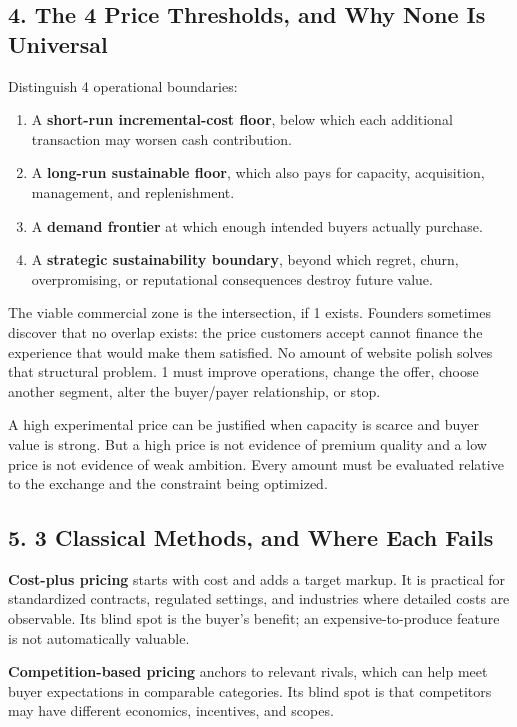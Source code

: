 \subsection*{4. The 4 Price Thresholds, and Why None Is Universal}

Distinguish 4 operational boundaries:
\begin{enumerate}
  \item A \textbf{short-run incremental-cost floor}, below which each additional transaction may worsen cash contribution.
  \item A \textbf{long-run sustainable floor}, which also pays for capacity, acquisition, management, and replenishment.
  \item A \textbf{demand frontier} at which enough intended buyers actually purchase.
  \item A \textbf{strategic sustainability boundary}, beyond which regret, churn, overpromising, or reputational consequences destroy future value.
\end{enumerate}

The viable commercial zone is the intersection, if 1 exists. Founders sometimes discover that no overlap exists: the price customers accept cannot finance the experience that would make them satisfied. No amount of website polish solves that structural problem. 1 must improve operations, change the offer, choose another segment, alter the buyer/payer relationship, or stop.

A high experimental price can be justified when capacity is scarce and buyer value is strong. But a high price is not evidence of premium quality and a low price is not evidence of weak ambition. Every amount must be evaluated relative to the exchange and the constraint being optimized.

\subsection*{5. 3 Classical Methods, and Where Each Fails}

\textbf{Cost-plus pricing} starts with cost and adds a target markup. It is practical for standardized contracts, regulated settings, and industries where detailed costs are observable. Its blind spot is the buyer's benefit; an expensive-to-produce feature is not automatically valuable.

\textbf{Competition-based pricing} anchors to relevant rivals, which can help meet buyer expectations in comparable categories. Its blind spot is that competitors may have different economics, incentives, and scopes.

